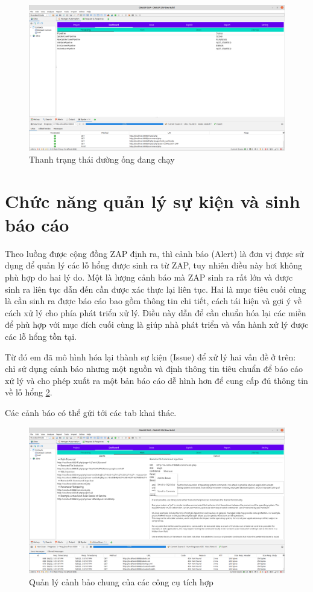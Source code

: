 \documentclass[./../main.tex]{subfiles}
\begin{document}
\begin{figure}[ht!]
	\includegraphics[width=\linewidth]{./images/state.png}
	\caption{Thanh trạng thái đường ống đang chạy}
	\label{fig:state}
\end{figure}

\section{Chức năng quản lý sự kiện và sinh báo cáo}
Theo luồng được cộng đồng ZAP định ra, thì cảnh báo (Alert) là đơn
vị được sử dụng để quản lý các lỗ hổng được sinh ra từ ZAP, tuy nhiên
điều này hơi không phù hợp do hai lý do. Một là lượng cảnh báo mà ZAP
sinh ra rất lớn và được sinh ra liên tục dẫn đến cần được xác thực lại
liên tục. Hai là mục tiêu cuối cùng là cần sinh ra được báo cáo bao gồm
thông tin chi tiết, cách tái hiện và gợi ý về cách xử lý cho phía
phát triển xử lý. Điều này dẫn để cần chuẩn hóa lại các miền để
phù hợp với mục đích cuối cùng là giúp nhà phát triển và vấn hành
xử lý được các lỗ hổng tồn tại.

Từ đó em đã mô hình hóa lại thành sự kiện (Issue) để xử lý hai vấn đề ở trên:
chỉ sử dụng cảnh báo nhưng một nguồn và định thông tin tiêu chuẩn để
báo cáo xử lý và cho phép xuất ra một bản báo cáo dễ hình hơn để cung
cấp đủ thông tin về lỗ hổng \ref{fig:alert}.

Các cảnh báo có thể gửi tới các tab khai thác.

\begin{figure}[ht!]
	\includegraphics[width=\linewidth]{./images/alert.png}
	\caption{Quản lý cảnh bảo chung của các công cụ tích hợp}
	\label{fig:alert}
\end{figure}
\end{document}
